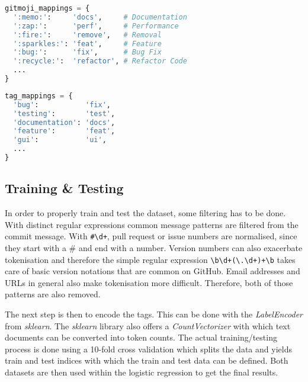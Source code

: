 \begin{lstlisting}[language=python, label={lst:gitmoji_map}, caption={Dictionary for Gitmoji mappings}]
gitmoji_mappings = {
  ':memo:':     'docs',     # Documentation
  ':zap:':      'perf',     # Performance
  ':fire:':     'remove',   # Removal
  ':sparkles:': 'feat',     # Feature
  ':bug:':      'fix',      # Bug Fix
  ':recycle:':  'refactor', # Refactor Code
  ...
}
\end{lstlisting}

\begin{lstlisting}[language=python, label={lst:tag_map}, caption={Dictionary for conventional tag mappings}]
tag_mappings = {
  'bug':           'fix',
  'testing':       'test',
  'documentation': 'docs',
  'feature':       'feat',
  'gui':           'ui',
  ...
}
\end{lstlisting}

\subsection{Training \& Testing}

In order to properly train and test the dataset, some filtering has to be done.
With distinct regular expressions common message patterns are filtered from
the commit message. With \lstinline{#\d+}, pull request or issue numbers
are normalised, since they start with a \# and end with a number. Version
numbers can also exacerbate tokenisation and therefore the simple regular
expression \lstinline{\b\d+(\.\d+)+\b} takes care of basic version notations
that are common on GitHub. Email addresses and URLs in general also make
tokenisation more difficult. Therefore, both of those patterns are also
removed.

The next step is then to encode the tags. This can be done with the
\textit{LabelEncoder} from \textit{sklearn}. The \textit{sklearn} library also
offers a \textit{CountVectorizer} with which text documents can be converted
into token counts. The actual training/testing process is done using a
10-fold cross validation which splits the data and yields train and test
indices with which the train and test data can be defined. Both datasets are
then used within the logistic regression to get the final results.
